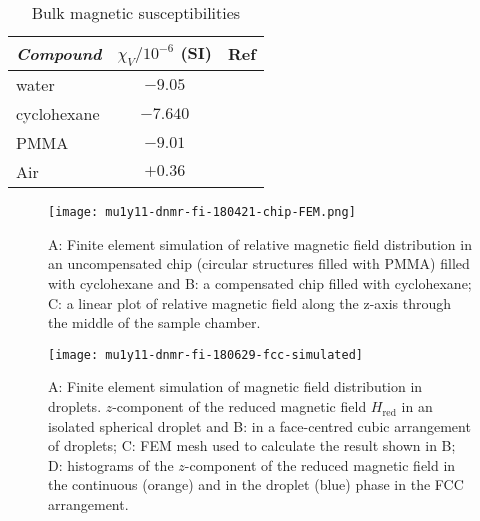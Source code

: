 \begin{table}
\begin{center}
    \caption{Bulk magnetic susceptibilities}
    \label{tab:suscept}
    \begin{tabular}{lcc}\hline\hline
      \emph{Compound} & $\chi_V/10^{-6}$ (SI) & Ref \\ \hline
      water           & $-9.05$               &    \citep{Rumble:2017tp}  \\
      cyclohexane     & $-7.640$              &    \citep{Rumble:2017tp} \\
      PMMA            & $-9.01$               &    \citep{Wapler:2014es}\\
      Air             & $+0.36$               &    \citep{Bakker:2006eea} \\ \hline\hline
    \end{tabular}
\end{center}
\end{table}



\begin{figure}
  \begin{center}
    \texttt{[image: mu1y11-dnmr-fi-180421-chip-FEM.png]}
  \end{center}
  \caption{A: Finite element simulation of relative magnetic field distribution in an uncompensated chip (circular structures filled with PMMA) filled with cyclohexane
      and B: a compensated chip filled with cyclohexane; C: a linear plot of relative magnetic field along the z-axis through the middle of the sample chamber.
    }
  \label{fig:FEM-chip}
\end{figure}


\begin{figure}
  \begin{center}
    \texttt{[image: mu1y11-dnmr-fi-180629-fcc-simulated]}
  \end{center}
  \caption{A: Finite element simulation of magnetic field distribution in droplets.
      $z$-component of the reduced magnetic field $H_\text{red}$ in an isolated spherical droplet
      and B: in a face-centred cubic arrangement of droplets; C: FEM mesh used
      to calculate the result shown in B; D: histograms of the $z$-component
      of the reduced magnetic field in the continuous (orange) and in the droplet (blue) phase
      in the FCC arrangement.
    }
  \label{fig:FEM-fcc}
\end{figure}



